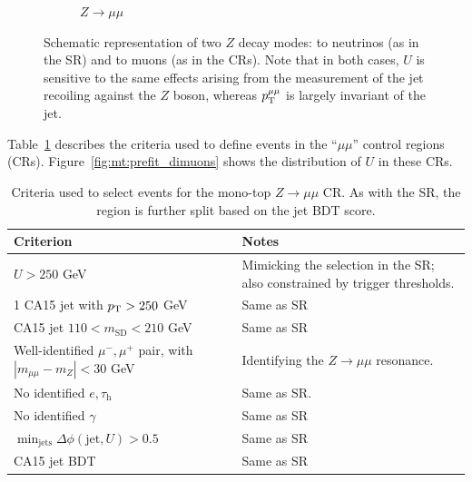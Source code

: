 \begin{figure}[!ht]
\begin{center}
\begin{subfigure}[t]{0.49\textwidth}
            \caption{$Z\rightarrow\mu\mu$}
        \end{subfigure}
        \caption{Schematic representation of two $Z$ decay modes: to neutrinos (as in the SR) and to muons (as in the CRs).
                 Note that in both cases, $U$ is sensitive to the same effects arising from the measurement of the jet recoiling against the $Z$ boson, whereas $p_\mathrm{T}^{\mu\mu}$ is largely invariant of the jet.}
        \label{fig:mt:zvsz}
    \end{center}
\end{figure}

Table~\ref{tab:mt:zmm_cuts} describes the criteria used to define events in the ``$\mu\mu$'' control regions (CRs). 
Figure~\ref{fig:mt:prefit_dimuons} shows the distribution of $U$ in these CRs. 

\begin{table}[!ht]
    \caption{Criteria used to select events for the mono-top $Z\rightarrow\mu\mu$ CR. As with the SR, the region is further split based on the jet BDT score.}
    \label{tab:mt:zmm_cuts}
    \begin{tabular}{p{}p{}}
        Criterion & Notes \\ 
        \hline 
        \hline 
        $U>250$ GeV & Mimicking the selection in the SR; also constrained by trigger thresholds. \\ 
        1 CA15 jet with $p_\mathrm{T}>250$ GeV &  Same as SR \\ 
        CA15 jet $110 < m_\mathrm{SD} < 210$ GeV & Same as SR \\ 
        \hline 
        Well-identified $\mu^-,\mu^+$ pair, with $|m_{\mu\mu}-m_Z|<30$ GeV & Identifying the $Z\rightarrow\mu\mu$ resonance. \\ 
        No identified $e,\tau_\mathrm{h}$ & Same as SR. \\ 
        No identified $\gamma$ & Same as SR \\ 
        \hline 
        $\min_\mathrm{jets}\Delta\phi(\mathrm{jet},U) > 0.5$ & Same as SR \\ 
        \hline 
        CA15 jet BDT & Same as SR\\ 
    \end{tabular}
\end{table}

